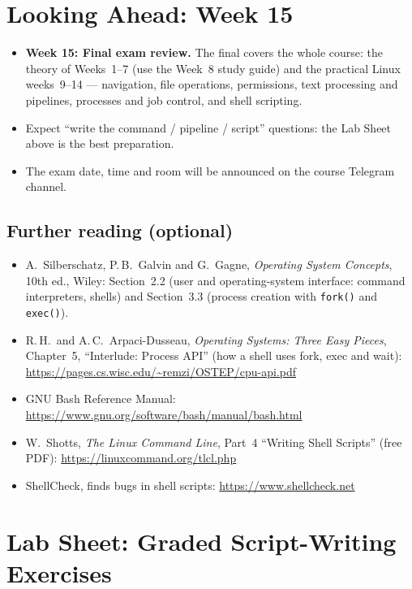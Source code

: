 \documentclass[11pt,a4paper]{article}
\begin{document}
\section{Looking Ahead: Week 15}

\begin{itemize}
  \item \textbf{Week 15: Final exam review.} The final covers the whole course: the theory of Weeks~1--7 (use the Week~8 study guide) and the practical Linux weeks~9--14 --- navigation, file operations, permissions, text processing and pipelines, processes and job control, and shell scripting.
  \item Expect “write the command / pipeline / script” questions: the Lab Sheet above is the best preparation.
  \item The exam date, time and room will be announced on the course Telegram channel.
\end{itemize}

\subsection*{Further reading (optional)}
\begin{itemize}
  \item A.\ Silberschatz, P.\,B.\ Galvin and G.\ Gagne, \emph{Operating System Concepts}, 10th ed., Wiley: Section~2.2 (user and operating-system interface: command interpreters, shells) and Section~3.3 (process creation with \texttt{fork()} and \texttt{exec()}).
  \item R.\,H.\ and A.\,C.\ Arpaci-Dusseau, \emph{Operating Systems: Three Easy Pieces}, Chapter~5, “Interlude: Process API” (how a shell uses fork, exec and wait): \url{https://pages.cs.wisc.edu/~remzi/OSTEP/cpu-api.pdf}
  \item GNU Bash Reference Manual: \url{https://www.gnu.org/software/bash/manual/bash.html}
  \item W.\ Shotts, \emph{The Linux Command Line}, Part~4 “Writing Shell Scripts” (free PDF): \url{https://linuxcommand.org/tlcl.php}
  \item ShellCheck, finds bugs in shell scripts: \url{https://www.shellcheck.net}
\end{itemize}

\section{Lab Sheet: Graded Script-Writing Exercises}
\end{document}
